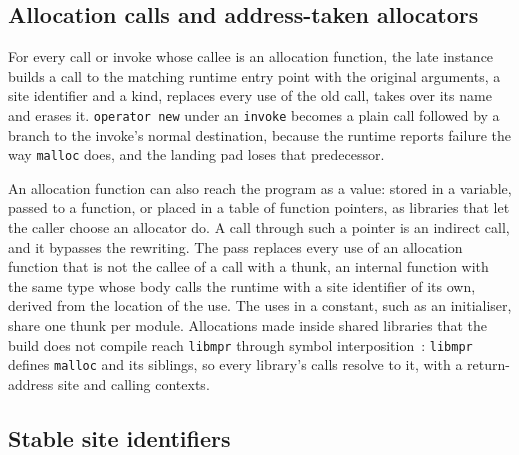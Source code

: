 \documentclass[11pt]{article}
\newcommand{\libmpr}{\texttt{libmpr}}
\begin{document}
\subsection{Allocation calls and address-taken allocators}

For every call or invoke whose callee is an allocation function, the late instance builds a call to the matching
runtime entry point with the original arguments, a site identifier and a kind, replaces every use of the old call,
takes over its name and erases it. \texttt{operator new} under an \texttt{invoke} becomes a plain call followed by a
branch to the invoke's normal destination, because the runtime reports failure the way \texttt{malloc} does, and
the landing pad loses that predecessor.

An allocation function can also reach the program as a value: stored in a variable, passed to a function, or
placed in a table of function pointers, as libraries that let the caller choose an allocator do. A call through
such a pointer is an indirect call, and it bypasses the rewriting. The pass replaces every use of an allocation
function that is not the callee of a call with a thunk, an internal function with the same type whose body calls
the runtime with a site identifier of its own, derived from the location of the use. The uses in a constant, such
as an initialiser, share one thunk per module. Allocations made inside shared libraries that the build does not
compile reach \libmpr{} through symbol interposition~\cite{OracleLinker}: \libmpr{} defines \texttt{malloc} and its
siblings, so every library's calls resolve to it, with a return-address site and calling contexts.

\subsection{Stable site identifiers}
\label{sec:ids}
\end{document}
